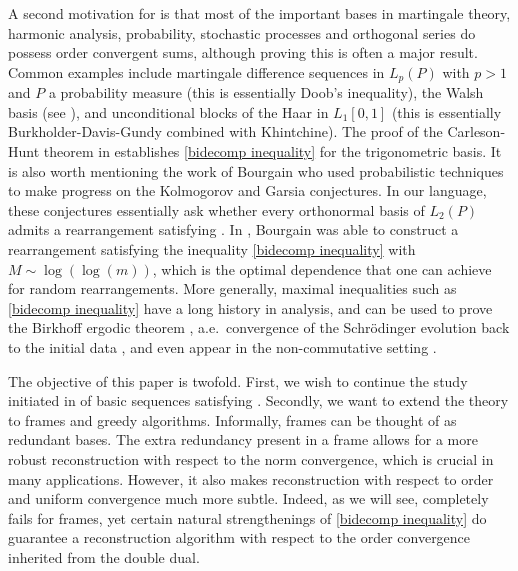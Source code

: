 \documentclass[12pt,leqno]{amsart}
\numberwithin{equation}{section}
\theoremstyle{definition}
\begin{document}
A second motivation for  is that most of the important bases in martingale theory, harmonic analysis, probability, stochastic processes and
orthogonal series  do possess order convergent sums, although proving this is often a major result.  Common examples include martingale difference sequences in $L_p(P)$ with $p>1$ and $P$ a probability measure (this is essentially Doob's inequality), the Walsh basis (see \cite{MR0241885}), and unconditional blocks of the Haar in $L_1[0,1]$ (this is essentially Burkholder-Davis-Gundy combined with Khintchine). The proof of the
Carleson-Hunt theorem in \cite{Hunt} establishes \eqref{bidecomp inequality}  for the
trigonometric basis. It is also worth mentioning the work of Bourgain
\cite{B89} who used probabilistic techniques to make progress on the
Kolmogorov and Garsia conjectures. In our language, these conjectures
essentially ask whether every orthonormal basis of $L_2(P)$ admits a 
rearrangement satisfying .  In \cite{B89}, Bourgain was able to construct a rearrangement satisfying the inequality \eqref{bidecomp inequality} with $M\sim \log(\log(m))$, which is the optimal dependence that one can achieve for random rearrangements. More generally, maximal inequalities such as \eqref{bidecomp inequality}  have a long history in analysis, and can be used to prove the Birkhoff ergodic theorem \cite{Stein}, a.e.~convergence of the Schr\"odinger evolution back to the initial data \cite{DZ19}, and even appear in the non-commutative setting \cite{HRW,  JX07, P93, S20}.  %
\medskip



The  objective of this paper is twofold. First, we wish  to continue the study initiated in \cite{ARTT,GKP, TT19} of basic sequences satisfying . Secondly, we want to extend the theory to frames and greedy algorithms. Informally, frames can be thought of as redundant bases. The extra redundancy present in a frame allows for a more robust reconstruction  with respect to the norm convergence, which is crucial in many applications. However, it also makes reconstruction with respect to  order and uniform convergence  much more subtle. Indeed, as we will see,   completely fails for frames, yet certain natural strengthenings of \eqref{bidecomp inequality} do guarantee a reconstruction algorithm with respect to the order convergence inherited from the double dual. %
\medskip
\end{document}
